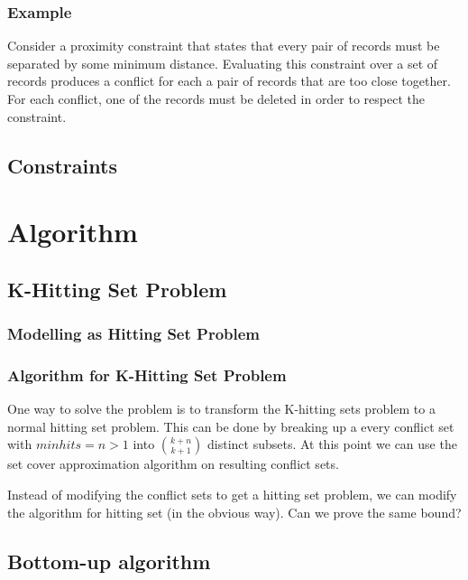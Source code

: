 \subsubsection{Example}
Consider a proximity constraint that states that every pair of records must be separated by some minimum distance. Evaluating this constraint over a set of records produces a conflict for each a pair of records that are too close together. For each conflict, one of the records must be deleted in order to respect the constraint.

\subsection{Constraints}






\section{Algorithm}

\subsection{K-Hitting Set Problem}

\subsubsection{Modelling as Hitting Set Problem}


\subsubsection{Algorithm for K-Hitting Set Problem}

One way to solve the problem is to transform the K-hitting sets problem to a normal hitting set problem. This can be done by breaking up a every conflict set with $minhits=n>1$ into $k+n \choose k+1$ distinct subsets. At this point we can use the set cover approximation algorithm on resulting conflict sets.

Instead of modifying the conflict sets to get a hitting set problem, we can modify the algorithm for hitting set (in the obvious way). Can we prove the same bound?

\subsection{Bottom-up algorithm}

